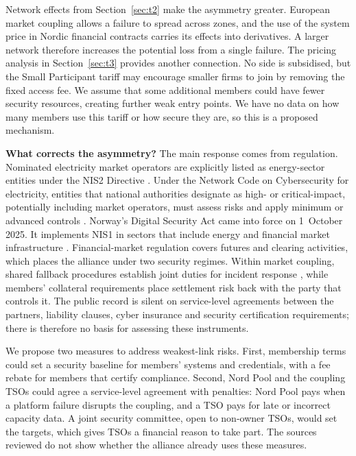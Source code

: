 Network effects from Section~\ref{sec:t2} make the asymmetry greater. European market coupling allows a failure to spread across zones, and the use of the system price in Nordic financial contracts carries its effects into derivatives. A larger network therefore increases the potential loss from a single failure. The pricing analysis in Section~\ref{sec:t3} provides another connection. No side is subsidised, but the Small Participant tariff may encourage smaller firms to join by removing the fixed access fee. We assume that some additional members could have fewer security resources, creating further weak entry points. We have no data on how many members use this tariff or how secure they are, so this is a proposed mechanism.

\textbf{What corrects the asymmetry?} The main response comes from regulation. Nominated electricity market operators are explicitly listed as energy-sector entities under the NIS2 Directive \citep{NIS2}. Under the Network Code on Cybersecurity for electricity, entities that national authorities designate as high- or critical-impact, potentially including market operators, must assess risks and apply minimum or advanced controls \citep{NCCS2024}. Norway's Digital Security Act came into force on 1~October 2025. It implements NIS1 in sectors that include energy and financial market infrastructure \citep{Regjeringen2025}. Financial-market regulation covers futures and clearing activities, which places the alliance under two security regimes. Within market coupling, shared fallback procedures establish joint duties for incident response \citep{NPIncident2019,SDAC2021}, while members' collateral requirements \citep{NPClearing} place settlement risk back with the party that controls it. The public record is silent on service-level agreements \citep[Def.~17.2]{OverbyAudestad2021} between the partners, liability clauses, cyber insurance and security certification requirements; there is therefore no basis for assessing these instruments.

We propose two measures to address weakest-link risks. First, membership terms could set a security baseline for members' systems and credentials, with a fee rebate for members that certify compliance. Second, Nord Pool and the coupling TSOs could agree a service-level agreement with penalties: Nord Pool pays when a platform failure disrupts the coupling, and a TSO pays for late or incorrect capacity data. A joint security committee, open to non-owner TSOs, would set the targets, which gives TSOs a financial reason to take part. The sources reviewed do not show whether the alliance already uses these measures.

